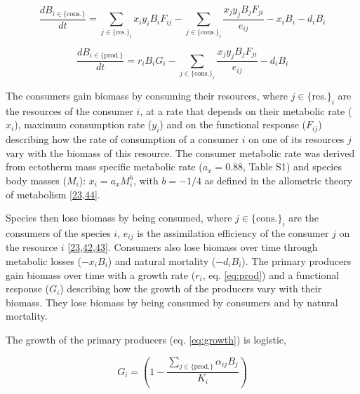 \documentclass[
]{article}
\begin{document}
\begin{equation}
    \label{eq:cons}
        \frac{dB_{i \in \{\mathrm{cons.}\}}}{dt} =
        \sum_{j \in \{\mathrm{res.}\}_i} x_i y_i B_i F_{ij}
        - \sum_{j \in \{\mathrm{cons.}\}_i} \frac{x_j y_j B_j F_{ji}}{e_{ij}}
        - x_i B_i - d_i B_i
\end{equation}

\begin{equation}
    \label{eq:prod}
    \frac{dB_{i \in \{\mathrm{prod.}\}}}{dt} =
    r_i B_i G_i
    - \sum_{j \in \{\mathrm{cons.}\}_i} \frac{x_j y_j B_j F_{ji}}{e_{ij}}
    - d_i B_i
\end{equation}

The consumers gain biomass by consuming their resources, where \(j\in\{\mathrm{res.}\}_i\)
are the resources of the consumer \(i\), at a rate that depends on their
metabolic rate (\(x_i\)), maximum consumption rate (\(y_i\)) and on the functional
response (\(F_{ij}\)) describing how the rate of consumption of a consumer \(i\) on
one of its resources \(j\) vary with the biomass of this resource. The consumer
metabolic rate was derived from ectotherm mass specific metabolic rate (\(a_x = 0.88\), Table S1) and species body masses (\(M_i\)): \(x_i=a_xM_i^b\), with \(b=-1/4\)
as defined in the allometric theory of metabolism {[}\protect\hyperlink{ref-brose_allometric_2006}{23},\protect\hyperlink{ref-brown_toward_2004}{44}{]}.

Species then lose biomass by being consumed, where \(j \in \{\mathrm{cons.}\}_i\) are the consumers
of the species \(i\), \(e_{ij}\) is the assimilation efficiency of the consumer \(j\) on the
resource \(i\) {[}\protect\hyperlink{ref-brose_allometric_2006}{23},\protect\hyperlink{ref-rooney_homage_2006}{42},\protect\hyperlink{ref-lajaaiti_ecologicalnetworksdynamicsjl_2025}{43}{]}. Consumers also lose biomass over
time through metabolic losses (\(-x_iB_i\)) and natural mortality (\(-d_iB_i\)). The
primary producers gain biomass over time with a growth rate (\(r_i\), eq. \eqref{eq:prod}) and a
functional response (\(G_i\)) describing how the growth of the producers vary with
their biomass. They lose biomass by being consumed by consumers and by natural
mortality.

The growth of the primary producers (eq. \eqref{eq:growth}) is logistic,

\begin{equation}
    \label{eq:growth}
    G_i = (1 - \dfrac{\sum_{j \in \{\mathrm{prod.}\}} \alpha_{ij} B_j}{K_i})
\end{equation}
\end{document}
